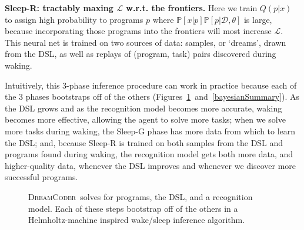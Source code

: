 \documentclass{article}
\newcommand{\system}{\textsc{DreamCoder}~}
\newcommand{\lowerBound}{\mathscr{L}}
\newcommand{\probability}{\mathds{P}} %
\begin{document}
\noindent\textbf{Sleep-R: tractably maxing $\lowerBound$ w.r.t. the
  frontiers.}  Here we train %
$Q(p|x)$ to assign high probability to programs $p$ where
$\probability[x|p]\probability[p|\mathcal{D},\theta]$ is large, because incorporating those programs
into the frontiers will most increase $\lowerBound$.
This neural net is trained on two sources of data: samples, or `dreams',
drawn from the DSL,
as well as
replays of (program, task) pairs discovered during waking.

Intuitively, this 3-phase inference procedure can work in practice because each of the 3 phases bootstraps off of the others (Figures~\ref{feeding}~and~\ref{bayesianSummary}). As the DSL grows and as the recognition model becomes more accurate, waking becomes more effective, allowing the agent to solve more tasks; when we solve more tasks during waking,
the Sleep-G phase has more data from which to learn the DSL; and, because Sleep-R is trained on both
samples from the DSL and programs found during waking,
the recognition model gets both more data, and higher-quality data, whenever the DSL improves and whenever we discover more successful programs.
\begin{figure}\centering
  \caption{\system solves for programs, the DSL, and a recognition model. Each of these steps bootstrap off of the others in a Helmholtz-machine inspired wake/sleep inference algorithm.}  \label{feeding}
\end{figure}
\end{document}
